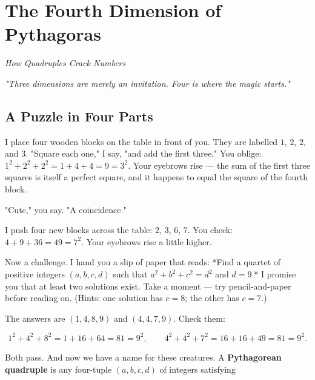 \documentclass[11pt,openright,twoside]{book}
\renewenvironment{quotation}{%
  \par\vspace{8pt}%
  \begin{list}{}{%
    \setlength{\leftmargin}{2em}%
    \setlength{\rightmargin}{2em}%
  }\item[]\itshape\color{pullquote}%
}{%
  \end{list}%
  \par\vspace{8pt}%
}
\theoremstyle{definition}
\begin{document}
\chapter{The Fourth Dimension of Pythagoras}
\label{ch:12}

\begin{center}
\textit{How Quadruples Crack Numbers}
\end{center}
\bigskip



\bigskip


\begin{quotation}
\noindent\itshape \textit{"Three dimensions are merely an invitation. Four is where the magic starts."}
\end{quotation}


\bigskip


\section{A Puzzle in Four Parts}

I place four wooden blocks on the table in front of you. They are labelled $1$, $2$, $2$, and $3$. "Square each one," I say, "and add the first three." You oblige: $1^2 + 2^2 + 2^2 = 1 + 4 + 4 = 9 = 3^2$. Your eyebrows rise --- the sum of the first three squares is itself a perfect square, and it happens to equal the square of the fourth block.

"Cute," you say. "A coincidence."

I push four new blocks across the table: $2$, $3$, $6$, $7$. You check: $4 + 9 + 36 = 49 = 7^2$. Your eyebrows rise a little higher.

Now a challenge. I hand you a slip of paper that reads: *Find a quartet of positive integers $(a, b, c, d)$ such that $a^2 + b^2 + c^2 = d^2$ and $d = 9$.* I promise you that at least two solutions exist. Take a moment --- try pencil-and-paper before reading on. (Hints: one solution has $c = 8$; the other has $c = 7$.)

The answers are $(1, 4, 8, 9)$ and $(4, 4, 7, 9)$. Check them:

\[1^2 + 4^2 + 8^2 = 1 + 16 + 64 = 81 = 9^2, \qquad 4^2 + 4^2 + 7^2 = 16 + 16 + 49 = 81 = 9^2.\]

Both pass. And now we have a name for these creatures. A \textbf{Pythagorean quadruple} is any four-tuple $(a, b, c, d)$ of integers satisfying
\end{document}
